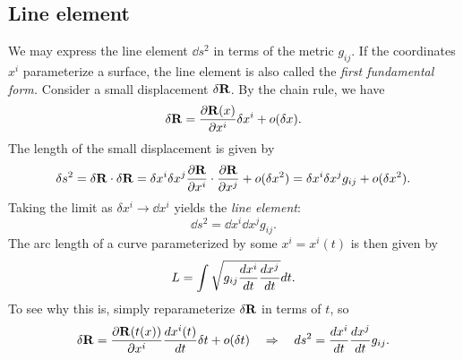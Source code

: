 \documentclass{article}
\begin{document}
	\subsection{Line element}
	We may express the line element $ \dd{s}^2 $ in terms of the metric $ g_{ij} $. If the coordinates $ x^{i} $ parameterize a surface, the line element is also called the \textit{first fundamental form.} Consider a small displacement $ \delta \vb{R} $. By the chain rule, we have
	\[
	\delta \vb{R} = \pdv{\vb{R}(x)}{x^{i}} \delta x^{i} + o(\delta x).
	\]
	The length of the small displacement is given by
	\[
	\delta s^2 = \delta \vb{R} \cdot \delta \vb{R} = \delta x^{i} \delta x^{j} \pdv{\vb{R}}{x^{i}} \cdot \pdv{\vb{R}}{x^{j}} + o(\delta x^2) =  \delta x^{i} \delta x^{j} g_{ij} + o(\delta x^2).
	\]
	Taking the limit as $ \delta x^{i} \to \dd x^{i} $ yields the \textit{line element}:
	\begin{equation}
	 \dd s^{2} = \dd x^{i} \dd x^{j} g_{ij}.
	\end{equation}
		The arc length of a curve parameterized by some $ x^{i} = x^{i}(t) $ is then given by
		\begin{equation}
			L = \int \sqrt{g_{ij}\dv{x^{i}}{t}\dv{x^{j}}{t}} \dd t.
		\end{equation}
	To see why this is, simply reparameterize $ \delta \vb{R} $ in terms of $ t $, so
	\[
	\delta \vb{R} = \pdv{\vb{R}(t(x))}{x^{i}}\dv{x^{i}(t)}{t} \delta t + o(\delta t) \quad \Rightarrow \quad \dd s^{2} = \dv{x^{i}}{t}\dv{x^{j}}{t} g_{ij}.
	\]
\end{document}

